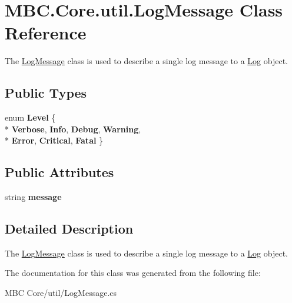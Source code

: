 \hypertarget{class_m_b_c_1_1_core_1_1util_1_1_log_message}{\section{M\-B\-C.\-Core.\-util.\-Log\-Message Class Reference}
\label{class_m_b_c_1_1_core_1_1util_1_1_log_message}
}


The \hyperlink{class_m_b_c_1_1_core_1_1util_1_1_log_message}{Log\-Message} class is used to describe a single log message to a \hyperlink{class_m_b_c_1_1_core_1_1util_1_1_log}{Log} object. 


\subsection*{Public Types}
\begin{DoxyCompactItemize}
\item 
enum {\bfseries Level} \{ \\*
{\bfseries Verbose}, 
{\bfseries Info}, 
{\bfseries Debug}, 
{\bfseries Warning}, 
\\*
{\bfseries Error}, 
{\bfseries Critical}, 
{\bfseries Fatal}
 \}
\end{DoxyCompactItemize}
\subsection*{Public Attributes}
\begin{DoxyCompactItemize}
\item 
\hypertarget{class_m_b_c_1_1_core_1_1util_1_1_log_message_a2a67b9a4e041e7358d799d61771d6463}{string {\bfseries message}}\label{class_m_b_c_1_1_core_1_1util_1_1_log_message_a2a67b9a4e041e7358d799d61771d6463}

\end{DoxyCompactItemize}


\subsection{Detailed Description}
The \hyperlink{class_m_b_c_1_1_core_1_1util_1_1_log_message}{Log\-Message} class is used to describe a single log message to a \hyperlink{class_m_b_c_1_1_core_1_1util_1_1_log}{Log} object.

The documentation for this class was generated from the following file\-:\begin{DoxyCompactItemize}
\item 
M\-B\-C Core/util/Log\-Message.\-cs\end{DoxyCompactItemize}
